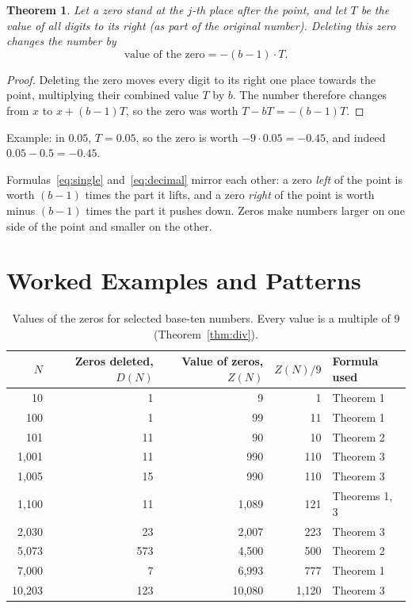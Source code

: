 \documentclass[11pt,a4paper]{article}
\newtheorem{theorem}{Theorem}
\theoremstyle{definition}
\newcommand{\Dz}{D}   %
\newcommand{\Zv}{Z}   %
\begin{document}
\begin{theorem}\label{thm:decimal}
Let a zero stand at the $j$-th place after the point, and let $T$ be the value of all digits to its right (as part of the original number). Deleting this zero changes the number by
\begin{equation}\label{eq:decimal}
  \text{value of the zero} = -(b-1)\cdot T .
\end{equation}
\end{theorem}
\begin{proof}
Deleting the zero moves every digit to its right one place towards the point, multiplying their combined value $T$ by $b$. The number therefore changes from $x$ to $x+(b-1)T$, so the zero was worth $T-bT=-(b-1)T$.
\end{proof}
Example: in $0.05$, $T=0.05$, so the zero is worth $-9\cdot 0.05=-0.45$, and indeed $0.05-0.5=-0.45$.

Formulas~\eqref{eq:single} and~\eqref{eq:decimal} mirror each other: a zero \emph{left} of the point is worth $(b-1)$ times the part it lifts, and a zero \emph{right} of the point is worth minus $(b-1)$ times the part it pushes down. Zeros make numbers larger on one side of the point and smaller on the other.

\section{Worked Examples and Patterns}\label{sec:examples}

\begin{table}[ht]
\centering\small
\begin{tabular}{@{}rrrrl@{}}
\toprule
$N$ & Zeros deleted, $\Dz(N)$ & Value of zeros, $\Zv(N)$ & $\Zv(N)/9$ & Formula used \\
\midrule
10 & 1 & 9 & 1 & Theorem 1 \\
100 & 1 & 99 & 11 & Theorem 1 \\
101 & 11 & 90 & 10 & Theorem 2 \\
1{,}001 & 11 & 990 & 110 & Theorem 3 \\
1{,}005 & 15 & 990 & 110 & Theorem 3 \\
1{,}100 & 11 & 1{,}089 & 121 & Theorems 1, 3 \\
2{,}030 & 23 & 2{,}007 & 223 & Theorem 3 \\
5{,}073 & 573 & 4{,}500 & 500 & Theorem 2 \\
7{,}000 & 7 & 6{,}993 & 777 & Theorem 1 \\
10{,}203 & 123 & 10{,}080 & 1{,}120 & Theorem 3 \\
\bottomrule
\end{tabular}
\caption{Values of the zeros for selected base-ten numbers. Every value is a multiple of $9$ (Theorem~\ref{thm:div}).}
\label{tab:examples}
\end{table}
\end{document}
